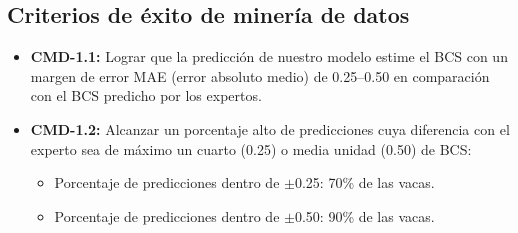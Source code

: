 \subsection{Criterios de éxito de minería de datos}

\begin{itemize}
  \item \textbf{CMD-1.1:} Lograr que la predicción de nuestro modelo estime el BCS con un margen de error MAE (error absoluto medio) de 0.25--0.50 en comparación con el BCS predicho por los expertos.
  \item \textbf{CMD-1.2:} Alcanzar un porcentaje alto de predicciones cuya diferencia con el experto sea de máximo un cuarto (0.25) o media unidad (0.50) de BCS:
  \begin{itemize}
    \item Porcentaje de predicciones dentro de $\pm$0.25: 70\% de las vacas.
    \item Porcentaje de predicciones dentro de $\pm$0.50: 90\% de las vacas.
  \end{itemize}
\end{itemize}
